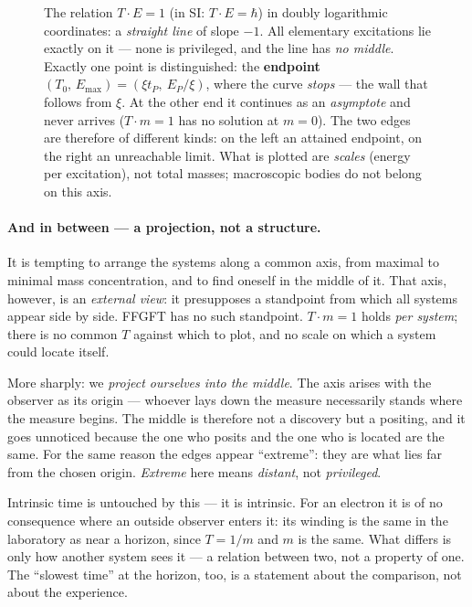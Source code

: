 \begin{figure}[htbp]
\caption{The relation $T\cdot E = 1$ (in SI: $T\cdot E = \hbar$) in doubly logarithmic
coordinates: a \emph{straight line} of slope $-1$. All elementary excitations lie exactly on it ---
none is privileged, and the line has \emph{no middle}. Exactly one point is distinguished: the
\textbf{endpoint} $(T_0,\,E_{\max}) = (\xi t_P,\ E_P/\xi)$, where the curve \emph{stops} --- the wall
that follows from $\xi$. At the other end it continues as an \emph{asymptote} and never arrives
($T\cdot m = 1$ has no solution at $m=0$). The two edges are therefore of different kinds: on the
left an attained endpoint, on the right an unreachable limit. What is plotted are \emph{scales}
(energy per excitation), not total masses; macroscopic bodies do not belong on this axis.}
\label{fig:306_hyperbel}
\end{figure}

\paragraph{And in between --- a projection, not a structure.} It is tempting to arrange the
systems along a common axis, from maximal to minimal mass concentration, and to find oneself in the
middle of it. That axis, however, is an \emph{external view}: it presupposes a standpoint from which
all systems appear side by side. FFGFT has no such standpoint. $T\cdot m = 1$ holds \emph{per
system}; there is no common $T$ against which to plot, and no scale on which a system could locate
itself.

More sharply: we \emph{project ourselves into the middle}. The axis arises with the observer as its
origin --- whoever lays down the measure necessarily stands where the measure begins. The middle is
therefore not a discovery but a positing, and it goes unnoticed because the one who posits and the
one who is located are the same. For the same reason the edges appear \enquote{extreme}: they are
what lies far from the chosen origin. \emph{Extreme} here means \emph{distant}, not
\emph{privileged}.

Intrinsic time is untouched by this --- it is intrinsic. For an electron it is of no consequence
where an outside observer enters it: its winding is the same in the laboratory as near a horizon,
since $T = 1/m$ and $m$ is the same. What differs is only how another system sees it --- a relation
between two, not a property of one. The \enquote{slowest time} at the horizon, too, is a statement
about the comparison, not about the experience.

